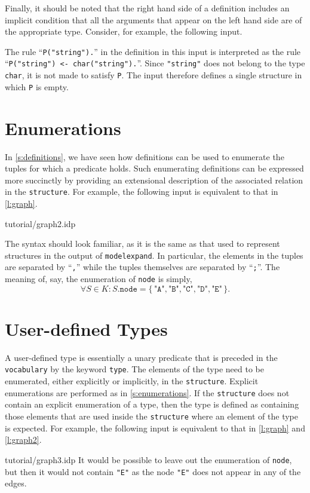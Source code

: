 \documentclass{article}
\begin{document}
Finally, it should be noted that the right hand side of a definition
includes an implicit condition that all the arguments that appear
on the left hand side are of the appropriate type.
Consider, for example, the following input.

The rule ``\lstinline{P("string").}'' in the definition in this input
is interpreted as the rule ``\lstinline{P("string") <- char("string").}''.
Since \lstinline{"string"} does not belong to the type \lstinline{char},
it is not made to satisfy \texttt{P}.
The input therefore defines a single structure in which \texttt{P}
is empty.

\section{Enumerations}\label{s:enumerations}

In \autoref{s:definitions}, we have seen how definitions can
be used to enumerate the tuples for which a predicate holds.
Such enumerating definitions can be expressed more succinctly
by providing an extensional description of the associated relation
in the \texttt{structure}.
For example, the following input is equivalent to that in
\autoref{l:graph}.

	{tutorial/graph2.idp}

The syntax should look familiar, as it is the same as that
used to represent structures in the output of \lstinline{modelexpand}.
In particular, the elements in the tuples are separated by ``\texttt{,}''
while the tuples themselves are separated by ``\texttt{;}''.
The meaning of, say, the enumeration of \texttt{node} is simply,
$$
\forall S \in K : S.\mathtt{node} =
\{\, \texttt{"A"},\texttt{"B"},\texttt{"C"},\texttt{"D"},\texttt{"E"} \,\}
.
$$

\section{User-defined Types}\label{s:user-defined}

A user-defined type is essentially a unary predicate that is preceded
in the \texttt{vocabulary} by the keyword \texttt{type}.
The elements of the type need to be enumerated, either explicitly
or implicitly, in the \texttt{structure}.
Explicit enumerations are performed as in \autoref{s:enumerations}.
If the \texttt{structure} does not contain an explicit enumeration
of a type, then the type is defined as containing those elements
that are used inside the \texttt{structure} where an element of the
type is expected.
For example, the following input is equivalent to that in
\autoref{l:graph} and \autoref{l:graph2}.

	{tutorial/graph3.idp}
It would be possible to leave out the enumeration of \texttt{node},
but then it would not contain \texttt{"E"} as the node \texttt{"E"}
does not appear in any of the edges.
\end{document}
